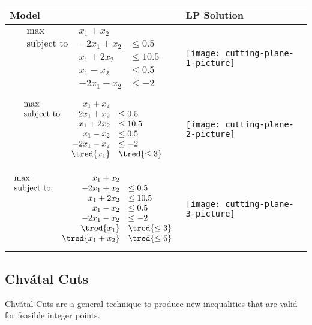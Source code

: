 \documentclass[../open-optimization/open-optimization.tex]{subfiles}
\begin{document}
\begin{table}[h]
\centering\begin{tabular}{>{\centering\arraybackslash}m{5cm}>{\centering\arraybackslash}m{10cm}}
 \hline
\textbf{Model} & \textbf{LP Solution} \\\hline \hline

$$
\begin{array}{lrl}
\max \ & x_1 + x_2\\
\text{subject to  } &  -2x_1 + x_2 &\leq 0.5\\
& x_1 + 2x_2 &\leq 10.5\\
& x_1 - x_2 &\leq 0.5\\
& - 2x_1 - x_2 &\leq -2
\end{array} 
$$
&
\texttt{[image: cutting-plane-1-picture]}\\
$$
\begin{array}{lrl}
\max \ & x_1 + x_2\\
\text{subject to  } &  -2x_1 + x_2 &\leq 0.5\\
& x_1 + 2x_2 &\leq 10.5\\
& x_1 - x_2 &\leq 0.5\\
& - 2x_1 - x_2 &\leq -2\\
& \tred{x_1} &\tred{\leq 3}
\end{array} 
$$
&
\texttt{[image: cutting-plane-2-picture]}\\
$$
\begin{array}{lrl}
\max \ & x_1 + x_2\\
\text{subject to  } &  -2x_1 + x_2 &\leq 0.5\\
& x_1 + 2x_2 &\leq 10.5\\
& x_1 - x_2 &\leq 0.5\\
& - 2x_1 - x_2 &\leq -2\\
& \tred{x_1} & \tred{\leq 3}\\
& \tred{x_1 + x_2} & \tred{\leq 6}
\end{array} 
$$
&
\texttt{[image: cutting-plane-3-picture]}\\
\hline
 \end{tabular}
\end{table}


\subsection{Chv\'atal Cuts}


Chv\'atal Cuts are a general technique to produce new inequalities that are valid for feasible integer points.  
\end{document}

